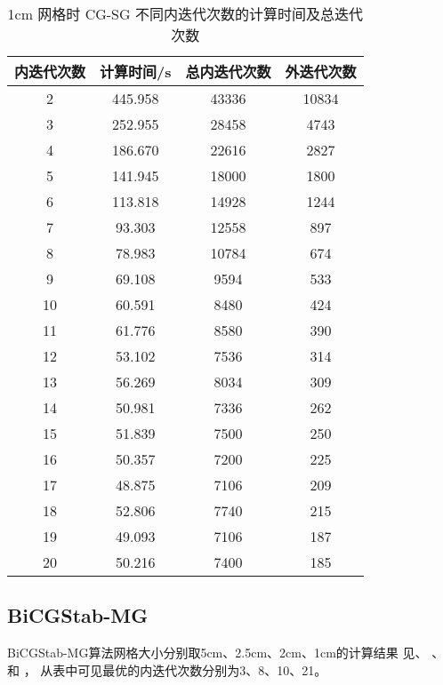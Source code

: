 \begin{datasheet}
\begin{table}
\centering
\caption{1cm 网格时 CG-SG 不同内迭代次数的计算时间及总迭代次数}
\label{tab:equsolve.iter.cg-sg.1cm}
\begin{tabular}{cccc}
\toprule
内迭代次数 & 计算时间/s & 总内迭代次数 & 外迭代次数\\
\midrule
2 & 445.958 & 43336 & 10834\\
3 & 252.955 & 28458 & 4743\\
4 & 186.670 & 22616 & 2827\\
5 & 141.945 & 18000 & 1800\\
6 & 113.818 & 14928 & 1244\\
7 & 93.303 & 12558 & 897\\
8 & 78.983 & 10784 & 674\\
9 & 69.108 & 9594 & 533\\
10 & 60.591 & 8480 & 424\\
11 & 61.776 & 8580 & 390\\
12 & 53.102 & 7536 & 314\\
13 & 56.269 & 8034 & 309\\
14 & 50.981 & 7336 & 262\\
15 & 51.839 & 7500 & 250\\
16 & 50.357 & 7200 & 225\\
17 & 48.875 & 7106 & 209\\
18 & 52.806 & 7740 & 215\\
19 & 49.093 & 7106 & 187\\
20 & 50.216 & 7400 & 185\\
\bottomrule
\end{tabular}
\end{table}

\end{datasheet}


\subsection{BiCGStab-MG}
\label{sec:equsolve.iter.bicgstab-mg}

BiCGStab-MG算法网格大小分别取5cm、2.5cm、2cm、1cm的计算结果
见、%
、%
和%
，
从表中可见最优的内迭代次数分别为3、8、10、21。


